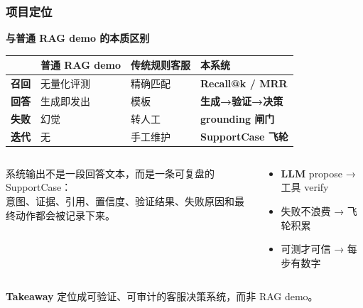 \documentclass[aspectratio=169,10pt]{beamer}
\newcommand{\takeaway}[1]{%
  \vfill%
  \begin{tcolorbox}[
    colback=Ctakebg, colframe=Ctakebg,
    arc=0pt, boxrule=0pt,
    left=7pt, right=7pt, top=4pt, bottom=4pt,
    width=\linewidth, nobeforeafter
  ]%
    {\scriptsize\color{white}\textbf{Takeaway}\enspace%
     \color{white!88!Ctakebg}#1}%
  \end{tcolorbox}%
}
\newcommand{\hi}[1]{{\bfseries\color{Cgreen}#1}}      %
\newcommand{\mono}[1]{{\ttfamily\small\color{Cblue!90!black}#1}}  %
\begin{document}
\begin{frame}
\frametitle{项目定位}

{\small\bfseries\color{Cmuted}与普通 RAG demo 的本质区别}\\[0.06cm]
\begin{tcolorbox}[enhanced, boxrule=0pt, colback=white, colframe=white, left=0pt, right=0pt, top=0pt, bottom=0pt]
{\footnotesize

\begin{tabularx}{\textwidth}{
    >{\bfseries}c 
    >{\raggedright\arraybackslash}X 
    >{\raggedright\arraybackslash}X 
    >{\raggedright\arraybackslash}X
}
\toprule
& {\color{Cmuted}普通 RAG demo} & {\color{Cmuted}传统规则客服} & {\bfseries\color{Cblue}本系统} \\
\midrule
\rowcolor{Cgraylt}
召回 & 无量化评测 & 精确匹配 & \hi{Recall@k / MRR} \\
回答 & 生成即发出 & 模板 & \hi{生成→验证→决策} \\
\rowcolor{Cgraylt}
失败 & 幻觉 & 转人工 & \hi{grounding 闸门} \\
迭代 & 无 & 手工维护 & \hi{SupportCase 飞轮} \\
\bottomrule
\end{tabularx}}
\end{tcolorbox}

\vspace{0.12cm}
\begin{columns}[T]
\begin{tcolorbox}[tcblue]
\footnotesize 系统输出不是一段回答文本，而是一条可复盘的 \mono{SupportCase}：\\
意图、证据、引用、置信度、验证结果、失败原因和最终动作都会被记录下来。
\end{tcolorbox}

\begin{tcolorbox}[tcgray, title={\color{Ctextdark}三条设计原则}]
\footnotesize
\begin{itemize}\setlength\itemsep{0.18em}
  \item \textbf{LLM} propose → 工具 verify
  \item 失败不浪费 → 飞轮积累
  \item 可测才可信 → 每步有数字
\end{itemize}
\end{tcolorbox}
\end{columns}

\takeaway{定位成可验证、可审计的客服决策系统，而非 RAG demo。}
\end{frame}
\end{document}
